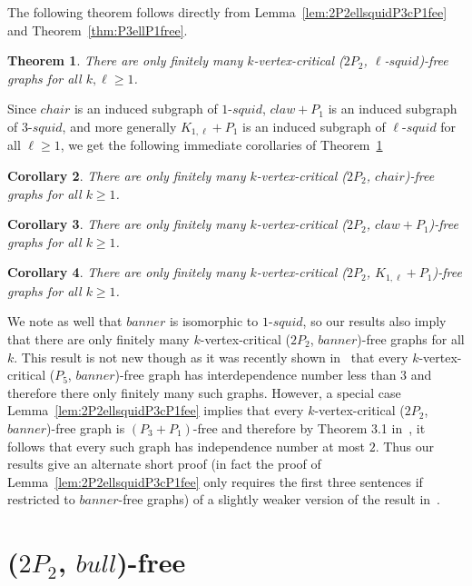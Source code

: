 \documentclass[11pt]{article}
\newtheorem{theorem}{Theorem}[section]
\newtheorem{corollary}[theorem]{Corollary}
\theoremstyle{definition}
\newcommand{\squid}[1]{$#1$-$squid$}
\begin{document}
The following theorem follows directly from Lemma~\ref{lem:2P2ellsquidP3cP1fee} and Theorem~\ref{thm:P3ellP1free}.

\begin{theorem}\label{thm:2P2ellsquidcrit}
There are only finitely many $k$-vertex-critical ($2P_2$, \squid{\ell})-free graphs for all $k,\ell\ge 1$.
\end{theorem}

Since $chair$ is an induced subgraph of \squid{1}, $claw+P_1$ is an induced subgraph of \squid{3}, and more generally  $K_{1,\ell}+P_1$ is an induced subgraph of \squid{\ell} for all $\ell\ge 1$, we get the following immediate corollaries of Theorem~\ref{thm:2P2ellsquidcrit} 

\begin{corollary}
There are only finitely many $k$-vertex-critical ($2P_2$, $chair$)-free graphs for all $k\ge 1$.
\end{corollary}

\begin{corollary}
There are only finitely many $k$-vertex-critical ($2P_2$, $claw+P_1$)-free graphs for all $k\ge 1$.
\end{corollary}

\begin{corollary}
There are only finitely many $k$-vertex-critical ($2P_2$, $K_{1,\ell}+P_1$)-free graphs for all $k\ge 1$.
\end{corollary}

We note as well that $banner$ is isomorphic to \squid{1}, so our results also imply that there are only finitely many $k$-vertex-critical ($2P_2$, $banner$)-free graphs for all $k$. This result is not new though as it was recently shown in~\cite{Brause2022} that every $k$-vertex-critical ($P_5$, $banner$)-free graph has interdependence number less than $3$ and therefore there only finitely many such graphs.  However, a special case Lemma~\ref{lem:2P2ellsquidP3cP1fee} implies that every $k$-vertex-critical ($2P_2$, $banner$)-free graph is $(P_3+P_1)$-free and therefore by Theorem 3.1 in~\cite{CameronHoangSawada2022}, it follows that every such graph has independence number at most $2$. Thus our results give an alternate short proof (in fact the proof of Lemma~\ref{lem:2P2ellsquidP3cP1fee} only requires the first three sentences if restricted to $banner$-free graphs) of a slightly weaker version of the result in~\cite{Brause2022}.


\section{($2P_2$, $bull$)-free}
\end{document}
